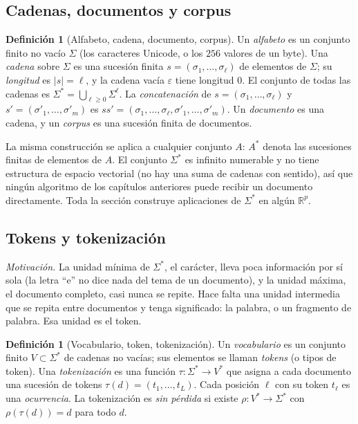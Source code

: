 \documentclass[11pt]{article}
\theoremstyle{definition}
\newtheorem{definicion}[teorema]{Definición}
\theoremstyle{remark}
\newcommand{\R}{\mathbb{R}}
\newcommand{\abs}[1]{\left\lvert #1\right\rvert}
\begin{document}
\subsection{Cadenas, documentos y corpus}\label{sec:cadenas}

\begin{definicion}[Alfabeto, cadena, documento, corpus]\label{def:cadena}
\noindent Un \emph{alfabeto} es un conjunto finito no vacío $\Sigma$ (los caracteres Unicode, o los $256$ valores de un byte). Una \emph{cadena} sobre $\Sigma$ es una sucesión finita $s=(\sigma_1,\dots,\sigma_\ell)$ de elementos de $\Sigma$; su \emph{longitud} es $\abs s=\ell$, y la cadena vacía $\varepsilon$ tiene longitud $0$. El conjunto de todas las cadenas es $\Sigma^*=\bigcup_{\ell\ge0}\Sigma^\ell$. La \emph{concatenación} de $s=(\sigma_1,\dots,\sigma_\ell)$ y $s'=(\sigma'_1,\dots,\sigma'_{m})$ es $ss'=(\sigma_1,\dots,\sigma_\ell,\sigma'_1,\dots,\sigma'_m)$. Un \emph{documento} es una cadena, y un \emph{corpus} es una sucesión finita de documentos.
\end{definicion}

\noindent La misma construcción se aplica a cualquier conjunto $A$: $A^*$ denota las sucesiones finitas de elementos de $A$. El conjunto $\Sigma^*$ es infinito numerable y no tiene estructura de espacio vectorial (no hay una suma de cadenas con sentido), así que ningún algoritmo de los capítulos anteriores puede recibir un documento directamente. Toda la sección construye aplicaciones de $\Sigma^*$ en algún $\R^p$.

\subsection{Tokens y tokenización}\label{sec:tokens}

\noindent \emph{Motivación.} La unidad mínima de $\Sigma^*$, el carácter, lleva poca información por sí sola (la letra ``e'' no dice nada del tema de un documento), y la unidad máxima, el documento completo, casi nunca se repite. Hace falta una unidad intermedia que se repita entre documentos y tenga significado: la palabra, o un fragmento de palabra. Esa unidad es el token.

\begin{definicion}[Vocabulario, token, tokenización]\label{def:token}
\noindent Un \emph{vocabulario} es un conjunto finito $V\subset\Sigma^*$ de cadenas no vacías; sus elementos se llaman \emph{tokens} (o tipos de token). Una \emph{tokenización} es una función $\tau:\Sigma^*\to V^*$ que asigna a cada documento una sucesión de tokens $\tau(d)=(t_1,\dots,t_L)$. Cada posición $\ell$ con su token $t_\ell$ es una \emph{ocurrencia}. La tokenización es \emph{sin pérdida} si existe $\rho:V^*\to\Sigma^*$ con $\rho(\tau(d))=d$ para todo $d$.
\end{definicion}
\end{document}
